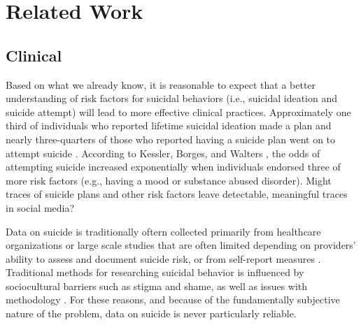 \documentclass[11pt]{article}
\begin{document}

\section{Related Work}
\subsection{Clinical}
Based on what we already know, it is reasonable to expect that a better understanding of risk factors for suicidal behaviors (i.e., suicidal ideation and suicide attempt) will lead to more effective clinical practices. Approximately one third of individuals who reported lifetime suicidal ideation made a plan and nearly three-quarters of those who reported having a suicide plan went on to attempt suicide \cite{kessler1999prevalence}. According to Kessler, Borges, and Walters  \cite{kessler1999prevalence}, the odds of attempting suicide increased exponentially when individuals endorsed three of more risk factors (e.g., having a mood or substance abused disorder). Might traces of suicide plans and other risk factors leave detectable, meaningful traces in social media?

Data on suicide is traditionally oftern collected primarily from healthcare organizations or large scale studies that are often limited depending on providers' ability to assess and document suicide risk, or from self-report measures \cite{crosby2011self,horowitz2009suicide}.  Traditional methods for researching suicidal behavior is influenced by sociocultural barriers such as stigma and shame, as well as issues with methodology \cite{crosby2011self}. For these reasons, and because of the fundamentally subjective nature of the problem, data on suicide is never particularly reliable. 
\end{document}
